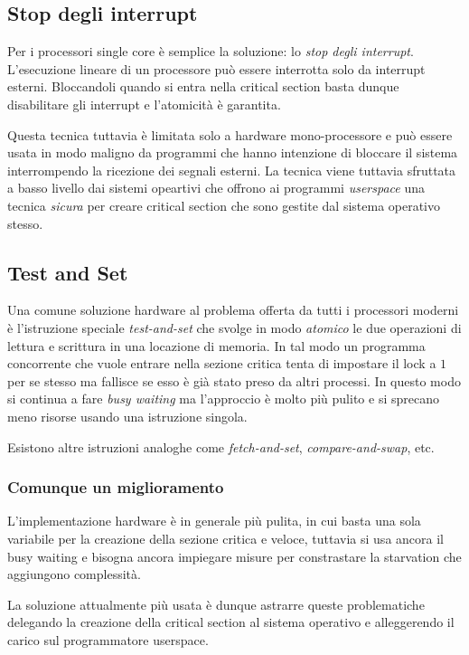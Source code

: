\documentclass{article}
\begin{document}
\subsection{Stop degli interrupt}

Per i processori single core \`e semplice la soluzione: lo \emph{stop degli
interrupt}. L'esecuzione lineare di un processore pu\`o essere interrotta solo
da interrupt esterni. Bloccandoli quando si entra nella critical section basta
dunque disabilitare gli interrupt e l'atomicit\`a \`e garantita.

Questa tecnica tuttavia \`e limitata solo a hardware mono-processore e pu\`o
essere usata in modo maligno da programmi che hanno intenzione di bloccare il
sistema interrompendo la ricezione dei segnali esterni.
La tecnica viene tuttavia sfruttata a basso livello dai sistemi opeartivi che
offrono ai programmi \emph{userspace} una tecnica \emph{sicura} per creare
critical section che sono gestite dal sistema operativo stesso.

\subsection{Test and Set}

Una comune soluzione hardware al problema offerta da tutti i processori moderni
\`e l'istruzione speciale \emph{test-and-set} che svolge in modo \emph{atomico}
le due operazioni di lettura e scrittura in una locazione di memoria. In tal
modo un programma concorrente che vuole entrare nella sezione critica tenta di
impostare il lock a $1$ per se stesso ma fallisce se esso \`e gi\`a stato preso
da altri processi. In questo modo si continua a fare \emph{busy waiting} ma 
l'approccio \`e molto pi\`u pulito e si sprecano meno risorse usando una
istruzione singola.

Esistono altre istruzioni analoghe come \emph{fetch-and-set}, \emph{compare-and-swap}, etc.

\subsubsection{Comunque un miglioramento}

L'implementazione hardware \`e in generale pi\`u pulita, in cui basta una sola
variabile per la creazione della sezione critica e veloce, tuttavia si usa
ancora il busy waiting e bisogna ancora impiegare misure per constrastare la
starvation che aggiungono complessit\`a.

La soluzione attualmente pi\`u usata \`e dunque astrarre queste problematiche
delegando la creazione della critical section al sistema operativo e alleggerendo
il carico sul programmatore userspace.
\end{document}
